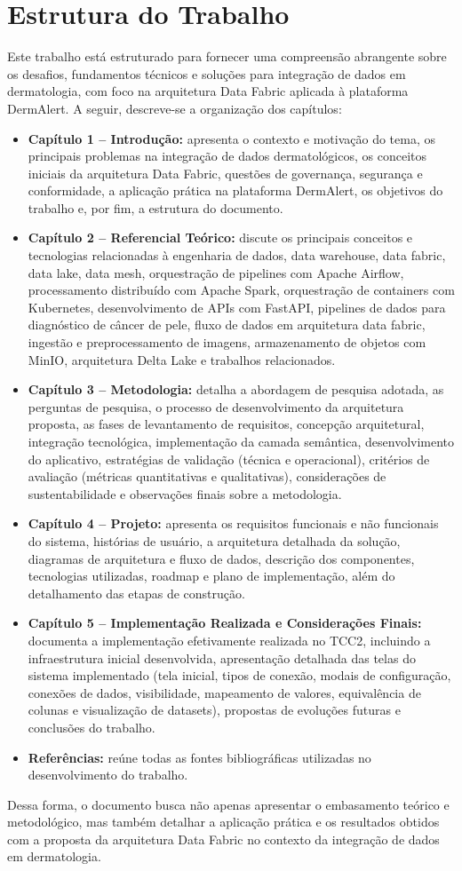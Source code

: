 \section{Estrutura do Trabalho}

Este trabalho está estruturado para fornecer uma compreensão abrangente sobre os desafios, fundamentos técnicos e soluções para integração de dados em dermatologia, com foco na arquitetura Data Fabric aplicada à plataforma DermAlert. A seguir, descreve-se a organização dos capítulos:

\begin{itemize}
    \item \textbf{Capítulo 1 – Introdução:} apresenta o contexto e motivação do tema, os principais problemas na integração de dados dermatológicos, os conceitos iniciais da arquitetura Data Fabric, questões de governança, segurança e conformidade, a aplicação prática na plataforma DermAlert, os objetivos do trabalho e, por fim, a estrutura do documento.
    \item \textbf{Capítulo 2 – Referencial Teórico:} discute os principais conceitos e tecnologias relacionadas à engenharia de dados, data warehouse, data fabric, data lake, data mesh, orquestração de pipelines com Apache Airflow, processamento distribuído com Apache Spark, orquestração de containers com Kubernetes, desenvolvimento de APIs com FastAPI, pipelines de dados para diagnóstico de câncer de pele, fluxo de dados em arquitetura data fabric, ingestão e preprocessamento de imagens, armazenamento de objetos com MinIO, arquitetura Delta Lake e trabalhos relacionados.
    \item \textbf{Capítulo 3 – Metodologia:} detalha a abordagem de pesquisa adotada, as perguntas de pesquisa, o processo de desenvolvimento da arquitetura proposta, as fases de levantamento de requisitos, concepção arquitetural, integração tecnológica, implementação da camada semântica, desenvolvimento do aplicativo, estratégias de validação (técnica e operacional), critérios de avaliação (métricas quantitativas e qualitativas), considerações de sustentabilidade e observações finais sobre a metodologia.
    \item \textbf{Capítulo 4 – Projeto:} apresenta os requisitos funcionais e não funcionais do sistema, histórias de usuário, a arquitetura detalhada da solução, diagramas de arquitetura e fluxo de dados, descrição dos componentes, tecnologias utilizadas, roadmap e plano de implementação, além do detalhamento das etapas de construção.
    \item \textbf{Capítulo 5 – Implementação Realizada e Considerações Finais:} documenta a implementação efetivamente realizada no TCC2, incluindo a infraestrutura inicial desenvolvida, apresentação detalhada das telas do sistema implementado (tela inicial, tipos de conexão, modais de configuração, conexões de dados, visibilidade, mapeamento de valores, equivalência de colunas e visualização de datasets), propostas de evoluções futuras e conclusões do trabalho.
    \item \textbf{Referências:} reúne todas as fontes bibliográficas utilizadas no desenvolvimento do trabalho.
\end{itemize}

Dessa forma, o documento busca não apenas apresentar o embasamento teórico e metodológico, mas também detalhar a aplicação prática e os resultados obtidos com a proposta da arquitetura Data Fabric no contexto da integração de dados em dermatologia.